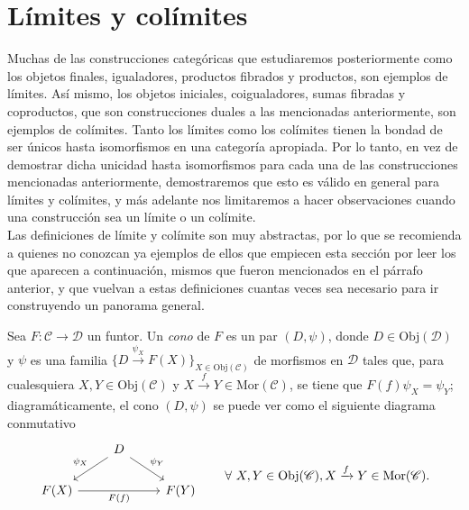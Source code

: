 \documentclass[tesis]{subfiles}
\begin{document}
\section{Límites y colímites} \label{Sec: Límites y colímites}

Muchas de las construcciones categóricas que estudiaremos posteriormente como los objetos finales, igualadores, productos fibrados y productos, son ejemplos de límites. Así mismo, los objetos iniciales, coigualadores, sumas fibradas y coproductos, que son construcciones duales a las mencionadas anteriormente, son ejemplos de colímites. Tanto los límites como los colímites tienen la bondad de ser únicos hasta isomorfismos en una categoría apropiada. Por lo tanto, en vez de demostrar dicha unicidad hasta isomorfismos para cada una de las construcciones mencionadas anteriormente, demostraremos que esto es válido en general para límites y colímites, y más adelante nos limitaremos a hacer observaciones cuando una construcción sea un límite o un colímite. \\

Las definiciones de límite y colímite son muy abstractas, por lo que se recomienda a quienes no conozcan ya ejemplos de ellos que empiecen esta sección por leer los que aparecen a continuación, mismos que fueron mencionados en el párrafo anterior, y que vuelvan a estas definiciones cuantas veces sea necesario para ir construyendo un panorama general.

\begin{Def} \label{Def: Cono} 
    Sea $F:\mathscr{C}\to \mathscr{D}$ un funtor. Un \emph{cono} de $F$ es un par $(D,\psi)$, donde $D\in\text{Obj}(\mathscr{D})$ y $\psi$ es una familia $\{D\xrightarrow[]{\psi_X} F(X)\}_{X\in\text{Obj}(\mathscr{C})}$ de morfismos en $\mathscr{D}$ tales que, para cualesquiera $X,Y\in\text{Obj}(\mathscr{C})$ y $X\xrightarrow[]{f} Y\in\text{Mor}(\mathscr{C})$, se tiene que $F(f)\psi_X=\psi_Y$; diagramáticamente, el cono $(D,\psi)$ se puede ver como el siguiente diagrama conmutativo
    \begin{equation}\label{eq: Cono}
        \begin{tikzcd}
            &D \arrow[]{dl}[swap]{\psi_X} \arrow[]{dr}[]{\psi_Y} &&&&&\empty{} \arrow[phantom]{d}[]{\forall \ X,Y\in\text{Obj}(\mathscr{C}), X\xrightarrow[]{f} Y\in\text{Mor}(\mathscr{C}).} \\
            F(X) \arrow[]{rr}[swap]{F(f)} &&F(Y) &&&&\empty{}
        \end{tikzcd}
    \end{equation}
\end{Def}
\end{document}
